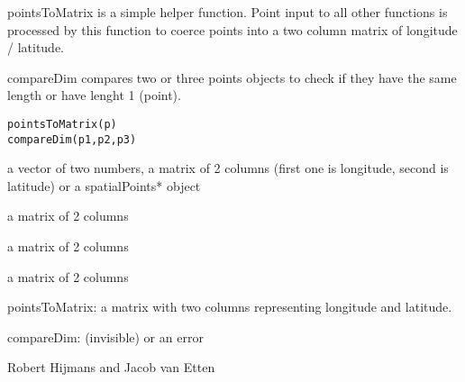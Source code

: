 \begin{Description}\relax
pointsToMatrix is a simple helper function. Point input to all other functions is processed by this function to coerce points into a two column matrix of longitude / latitude. 

compareDim compares two or three points objects to check if they have the same length or have lenght 1 (point).
\end{Description}
\begin{Usage}
\begin{verbatim}
pointsToMatrix(p)
compareDim(p1,p2,p3)
\end{verbatim}
\end{Usage}
\begin{Arguments}
\begin{ldescription}
\item[\code{p}] a vector of two numbers, a matrix of 2 columns (first one is longitude, second is latitude) or a spatialPoints* object
\item[\code{p1}] a matrix of 2 columns
\item[\code{p2}] a matrix of 2 columns
\item[\code{p3}] a matrix of 2 columns
\end{ldescription}
\end{Arguments}
\begin{Value}
pointsToMatrix: a matrix with two columns representing longitude and latitude.

compareDim:  (invisible) or an error
\end{Value}
\begin{Author}\relax
Robert Hijmans and Jacob van Etten
\end{Author}

